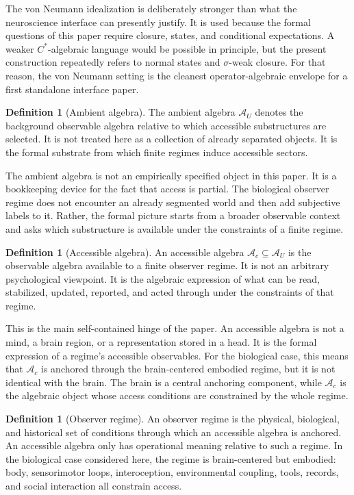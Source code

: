 \documentclass[12pt]{article}
\theoremstyle{definition}
\newtheorem{definition}[proposition]{Definition}
\theoremstyle{remark}
\newcommand{\AU}{\mathcal A_U}
\newcommand{\Ac}{\mathcal A_c}
\begin{document}
The von Neumann idealization is deliberately stronger than what the
neuroscience interface can presently justify. It is used because the
formal questions of this paper require closure, states, and conditional
expectations. A weaker \(C^*\)-algebraic language would be possible in
principle, but the present construction repeatedly refers to normal
states and \(\sigma\)-weak closure. For that reason, the von Neumann
setting is the cleanest operator-algebraic envelope for a first
standalone interface paper.

\begin{definition}[Ambient algebra]
The ambient algebra \(\AU\) denotes the background observable algebra
relative to which accessible substructures are selected. It is not
treated here as a collection of already separated objects. It is the
formal substrate from which finite regimes induce accessible sectors.
\end{definition}

The ambient algebra is not an empirically specified object in this
paper. It is a bookkeeping device for the fact that access is partial.
The biological observer regime does not encounter an already segmented
world and then add subjective labels to it. Rather, the formal picture
starts from a broader observable context and asks which substructure is
available under the constraints of a finite regime.

\begin{definition}[Accessible algebra]
An accessible algebra \(\Ac\subseteq\AU\) is the observable algebra
available to a finite observer regime. It is not an arbitrary
psychological viewpoint. It is the algebraic expression of what can be
read, stabilized, updated, reported, and acted through under the
constraints of that regime.
\end{definition}

This is the main self-contained hinge of the paper. An accessible
algebra is not a mind, a brain region, or a representation stored in a
head. It is the formal expression of a regime's accessible observables.
For the biological case, this means that \(\Ac\) is anchored through the
brain-centered embodied regime, but it is not identical with the brain.
The brain is a central anchoring component, while \(\Ac\) is the
algebraic object whose access conditions are constrained by the whole
regime.

\begin{definition}[Observer regime]
An observer regime is the physical, biological, and historical set of
conditions through which an accessible algebra is anchored. An
accessible algebra only has operational meaning relative to such a
regime. In the biological case considered here, the regime is
brain-centered but embodied: body, sensorimotor loops, interoception,
environmental coupling, tools, records, and social interaction all
constrain access.
\end{definition}
\end{document}

